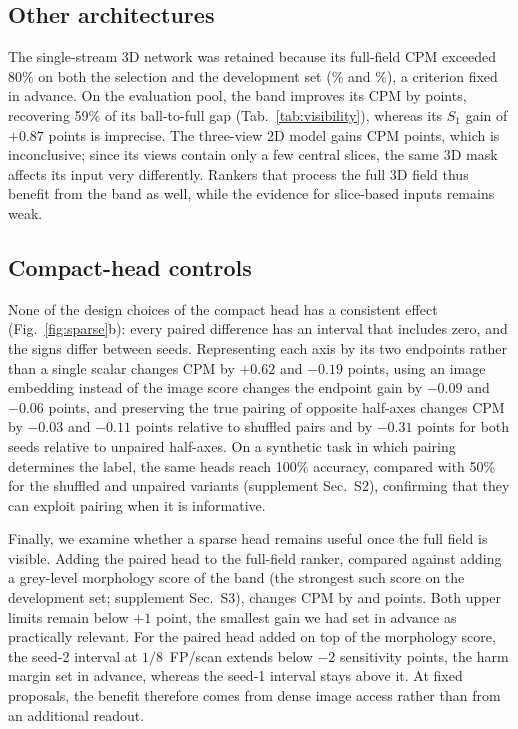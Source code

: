 \subsection{Other architectures}
\label{sec:breadth_result}

The single-stream 3D network was retained because its full-field CPM exceeded 80\% on both the selection and the development set (\SingleCheck\% and \SingleDev\%), a criterion fixed in advance. On the evaluation pool, the band improves its CPM by \SingleGain{} points, recovering 59\% of its ball-to-full gap (Tab.~\ref{tab:visibility}), whereas its $S_1$ gain of $+0.87$ points is imprecise. The three-view 2D model gains \TriGain{} CPM points, which is inconclusive; since its views contain only a few central slices, the same 3D mask affects its input very differently. Rankers that process the full 3D field thus benefit from the band as well, while the evidence for slice-based inputs remains weak.

\subsection{Compact-head controls}
\label{sec:compact_result}

None of the design choices of the compact head has a consistent effect (Fig.~\ref{fig:sparse}b): every paired difference has an interval that includes zero, and the signs differ between seeds. Representing each axis by its two endpoints rather than a single scalar changes CPM by $+0.62$ and $-0.19$ points, using an image embedding instead of the image score changes the endpoint gain by $-0.09$ and $-0.06$ points, and preserving the true pairing of opposite half-axes changes CPM by $-0.03$ and $-0.11$ points relative to shuffled pairs and by $-0.31$ points for both seeds relative to unpaired half-axes. On a synthetic task in which pairing determines the label, the same heads reach 100\% accuracy, compared with 50\% for the shuffled and unpaired variants (supplement Sec.~S2), confirming that they can exploit pairing when it is informative.

Finally, we examine whether a sparse head remains useful once the full field is visible. Adding the paired head to the full-field ranker, compared against adding a grey-level morphology score of the band (the strongest such score on the development set; supplement Sec.~S3), changes CPM by \PracticalPrimary{} and \PracticalRepeat{} points. Both upper limits remain below $+1$ point, the smallest gain we had set in advance as practically relevant. For the paired head added on top of the morphology score, the seed-2 interval at $1/8$~FP/scan extends below $-2$ sensitivity points, the harm margin set in advance, whereas the seed-1 interval stays above it. At fixed proposals, the benefit therefore comes from dense image access rather than from an additional readout.
